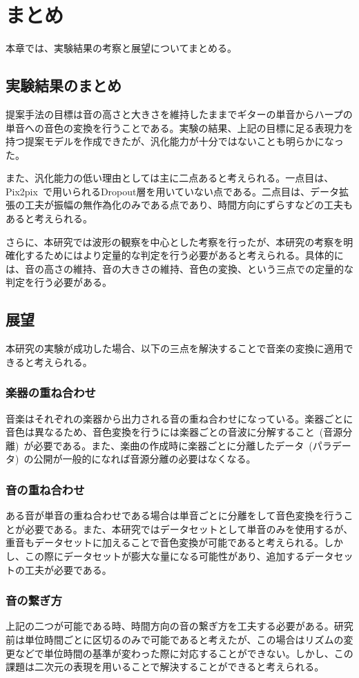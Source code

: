 \chapter{まとめ}

本章では、実験結果の考察と展望についてまとめる。

\section{実験結果のまとめ}

提案手法の目標は音の高さと大きさを維持したままでギターの単音からハープの単音への音色の変換を行うことである。実験の結果、上記の目標に足る表現力を持つ提案モデルを作成できたが、汎化能力が十分ではないことも明らかになった。

また、汎化能力の低い理由としては主に二点あると考えられる。一点目は、Pix2pix~\cite{pix2pix}で用いられるDropout層を用いていない点である。二点目は、データ拡張の工夫が振幅の無作為化のみである点であり、時間方向にずらすなどの工夫もあると考えられる。

さらに、本研究では波形の観察を中心とした考察を行ったが、本研究の考察を明確化するためにはより定量的な判定を行う必要があると考えられる。具体的には、音の高さの維持、音の大きさの維持、音色の変換、という三点での定量的な判定を行う必要がある。

\section{展望}

本研究の実験が成功した場合、以下の三点を解決することで音楽の変換に適用できると考えられる。

\subsection{楽器の重ね合わせ}

音楽はそれぞれの楽器から出力される音の重ね合わせになっている。楽器ごとに音色は異なるため、音色変換を行うには楽器ごとの音波に分解すること~(音源分離)~が必要である。また、楽曲の作成時に楽器ごとに分離したデータ~(パラデータ)~の公開が一般的になれば音源分離の必要はなくなる。

\subsection{音の重ね合わせ}

ある音が単音の重ね合わせである場合は単音ごとに分離をして音色変換を行うことが必要である。また、本研究ではデータセットとして単音のみを使用するが、重音もデータセットに加えることで音色変換が可能であると考えられる。しかし、この際にデータセットが膨大な量になる可能性があり、追加するデータセットの工夫が必要である。

\subsection{音の繋ぎ方}

上記の二つが可能である時、時間方向の音の繋ぎ方を工夫する必要がある。研究前は単位時間ごとに区切るのみで可能であると考えたが、この場合はリズムの変更などで単位時間の基準が変わった際に対応することができない。しかし、この課題は二次元の表現を用いることで解決することができると考えられる。

